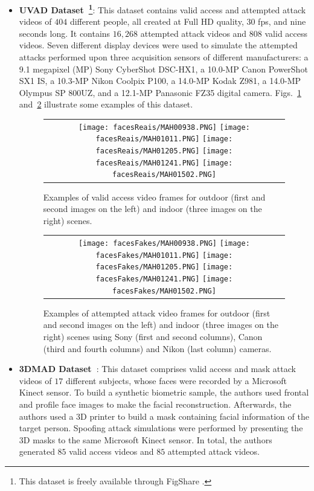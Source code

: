 \begin{itemize}
\item \textbf{UVAD Dataset~\cite{Pinto:Unicamp:2013, Pinto:TIFS:2015}\footnote{This dataset is freely available through FigShare .}}: This dataset contains valid access and attempted attack videos of {$404$ different people}, all created at Full HD quality, $30$ fps, and nine seconds long. It contains {$16,268$ attempted attack videos and $808$ valid access videos}. {Seven different display devices} were used to simulate the attempted attacks performed upon three acquisition sensors of different manufacturers: {a 9.1 megapixel (MP) Sony CyberShot DSC-HX1, a 10.0-MP Canon PowerShot SX1 IS, a 10.3-MP Nikon Coolpix P100, a 14.0-MP Kodak Z981, a 14.0-MP Olympus SP 800UZ, and a 12.1-MP Panasonic FZ35 digital camera. Figs.~\ref{fig:exemplosVideosValidos} and~\ref{fig:exemplosVideosAtaque} illustrate some examples of this dataset.}
%
\begin{figure}[!htb]
\centering
\begin{tabular}{c}
	\texttt{[image: facesReais/MAH00938.PNG]}
	\texttt{[image: facesReais/MAH01011.PNG]}
	\texttt{[image: facesReais/MAH01205.PNG]}
	\texttt{[image: facesReais/MAH01241.PNG]}
	\texttt{[image: facesReais/MAH01502.PNG]}
\end{tabular}
\caption{Examples of valid access video frames for outdoor (first and second images on the left) and indoor (three images on the right) scenes.}
\label{fig:exemplosVideosValidos}
\end{figure}
%
\begin{figure}[!htb]
\centering
\begin{tabular}{c}
	\texttt{[image: facesFakes/MAH00938.PNG]}
	\texttt{[image: facesFakes/MAH01011.PNG]}
	\texttt{[image: facesFakes/MAH01205.PNG]}
	\texttt{[image: facesFakes/MAH01241.PNG]}
	\texttt{[image: facesFakes/MAH01502.PNG]}
\end{tabular}
\caption{Examples of attempted attack video frames for outdoor (first and second images on the left) and indoor (three images on the right) scenes using Sony (first and second columns), Canon (third and fourth columns) and Nikon (last column) cameras.}
\label{fig:exemplosVideosAtaque}
\end{figure}

\item \textbf{3DMAD Dataset~\cite{Erdogmus:BTAS:2013}}: This dataset comprises valid access and mask attack videos of $17$ different subjects, whose faces were recorded by a Microsoft Kinect sensor. To build a synthetic biometric sample, the authors used frontal and profile face images to make the facial reconstruction. Afterwards, the authors used a 3D printer to build a mask containing facial information of the target person. Spoofing attack simulations were performed by presenting the 3D masks to the same Microsoft Kinect sensor. In total, the authors generated $85$ valid access videos and $85$ attempted attack videos.
\end{itemize}

